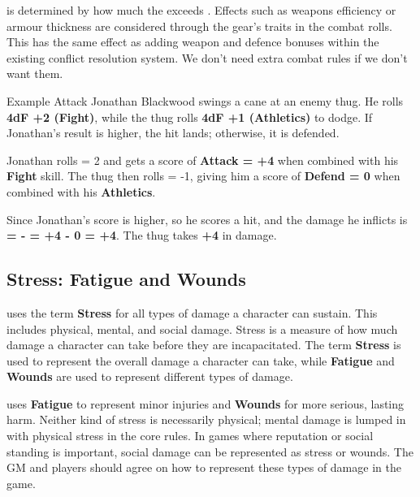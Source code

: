 \begin{multicols}{2}
\Damage is determined by how much the \Attack exceeds \Defend. Effects such as weapons efficiency or armour thickness are considered through the gear's traits in the combat rolls. This has the same effect as adding weapon and defence bonuses within the existing conflict resolution system. We don't need extra combat rules if we don't want them.

\begin{Example}{Example Attack}
	Jonathan Blackwood swings a cane at an enemy thug. He rolls \textbf{4dF +2 (Fight)}, while the thug rolls \textbf{4dF +1 (Athletics)} to dodge. If Jonathan’s result is higher, the hit lands; otherwise, it is defended.
	
	Jonathan rolls \FudgeRes{+++-} = 2 and gets a score of \textbf{Attack = +4} when combined with his \textbf{Fight} skill. The thug then rolls  = -1, giving him a score of \textbf{Defend = 0} when combined with his \textbf{Athletics}.
	
	Since Jonathan's score is higher, so he scores a hit, and the damage he inflicts is \textbf{\Damage = \Attack - \Defend = +4 - 0 = +4}. The thug takes \textbf{+4} in damage.
\end{Example}


\subsection{Stress: Fatigue and Wounds}

\wyrd uses the term \textbf{Stress} for all types of damage a character can sustain. This includes physical, mental, and social damage. Stress is a measure of how much damage a character can take before they are incapacitated. The term \textbf{Stress} is used to represent the overall damage a character can take, while \textbf{Fatigue} and \textbf{Wounds} are used to represent different types of damage.

\wyrd uses \textbf{Fatigue} to represent minor injuries and \textbf{Wounds} for more serious, lasting harm. Neither kind of stress is necessarily physical; mental damage is lumped in with physical stress in the core rules. In games where reputation or social standing is important, social damage can be represented as stress or wounds. The GM and players should agree on how to represent these types of damage in the game.


\end{multicols}
